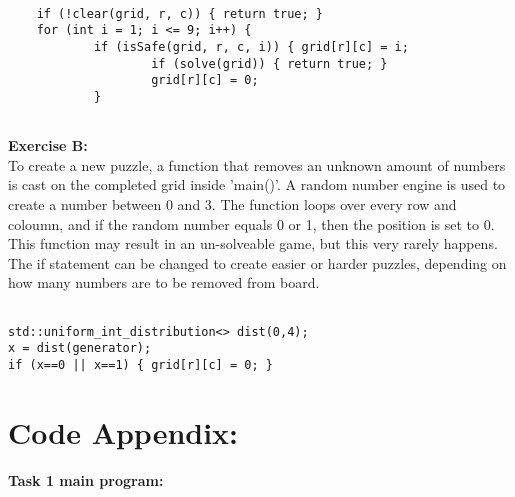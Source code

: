 \documentclass[11pt]{amsart}
\begin{document}
\begin{verbatim}

	if (!clear(grid, r, c)) { return true; }
	for (int i = 1; i <= 9; i++) {
			if (isSafe(grid, r, c, i)) { grid[r][c] = i;
					if (solve(grid)) { return true; }
					grid[r][c] = 0;
			}


\end{verbatim}


\textbf{Exercise B:} \\

To create a new puzzle, a function that removes an unknown amount of numbers is
cast on the completed grid inside 'main()'. A random number engine is used to create a number
between 0 and 3. The function loops over every row and coloumn, and if the random number
equals 0 or 1, then the position is set to 0. \\
This function may result in an un-solveable game, but this very rarely happens. \\
The if statement can be changed to create easier or harder puzzles, depending on how many
numbers are to be removed from board. \\

\begin{verbatim}

std::uniform_int_distribution<> dist(0,4);
x = dist(generator);
if (x==0 || x==1) { grid[r][c] = 0; }

\end{verbatim}

\section{\textbf{Code Appendix:}}

\textbf{Task 1 main program:}
\end{document}
